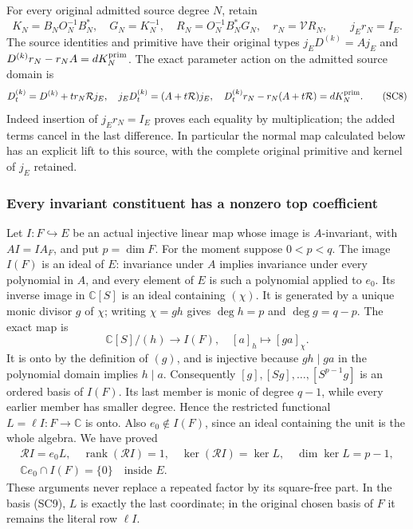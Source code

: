 For every original admitted source degree $N$, retain
\[
 K_N=B_NO_N^{-1}B_N^*,\quad G_N=K_N^{-1},\quad
 R_N=O_N^{-1}B_N^*G_N,\quad r_N=\mathcal V R_N,
 \qquad j_Er_N=I_E.
 \tag{SC7}
\]
The source identities and primitive have their original types
$j_ED^{(k)}=Aj_E$ and
$D^{(k)}r_N-r_NA=dK_N^{\rm prim}$.
The exact parameter action on the admitted source domain is
\[
 D_t^{(k)}=D^{(k)}+t r_N\mathcal Rj_E,
 \quad j_ED_t^{(k)}=(A+t\mathcal R)j_E,
 \quad D_t^{(k)}r_N-r_N(A+t\mathcal R)=dK_N^{\rm prim}.
 \tag{SC8}
\]
Indeed insertion of $j_Er_N=I_E$ proves each equality by multiplication;
the added terms cancel in the last difference.  In particular the
normal map calculated below has an explicit lift to this source, with
the complete original primitive and kernel of $j_E$ retained.

\subsubsection{Every invariant constituent has a nonzero top coefficient}

Let $I:F\hookrightarrow E$ be an actual injective linear map whose
image is $A$-invariant, with $AI=IA_F$, and put $p=\dim F$.
For the moment suppose $0<p<q$.  The image $I(F)$ is an ideal of
$E$: invariance under $A$ implies invariance under every polynomial
in $A$, and every element of $E$ is such a polynomial applied to $e_0$.
Its inverse image in $\mathbb C[S]$ is an ideal containing $(\chi)$.
It is generated by a unique monic divisor $g$ of $\chi$; writing
$\chi=gh$ gives $\deg h=p$ and $\deg g=q-p$.  The exact map is
\[
 \mathbb C[S]/(h)\longrightarrow I(F),\quad [a]_h\longmapsto[ga]_\chi.
 \tag{SC9}
\]
It is onto by the definition of $(g)$, and is injective because
$gh\mid ga$ in the polynomial domain implies $h\mid a$.
Consequently $[g],[Sg],\ldots,[S^{p-1}g]$ is an ordered basis of
$I(F)$.  Its last member is monic of degree $q-1$, while every earlier
member has smaller degree.  Hence the restricted functional
$L=\ell I:F\to\mathbb C$ is onto.  Also $e_0\notin I(F)$, since an
ideal containing the unit is the whole algebra.  We have proved
\[
 \begin{gathered}
 \mathcal R I=e_0L,\quad \operatorname{rank}(\mathcal R I)=1,
 \quad\ker(\mathcal R I)=\ker L,\quad\dim\ker L=p-1,\\
 \mathbb C e_0\cap I(F)=\{0\}\quad\text{inside }E.
 \end{gathered}
 \tag{SC10}
\]
These arguments never replace a repeated factor by its square-free
part.  In the basis (SC9), $L$ is exactly the last coordinate; in the
original chosen basis of $F$ it remains the literal row $\ell I$.


